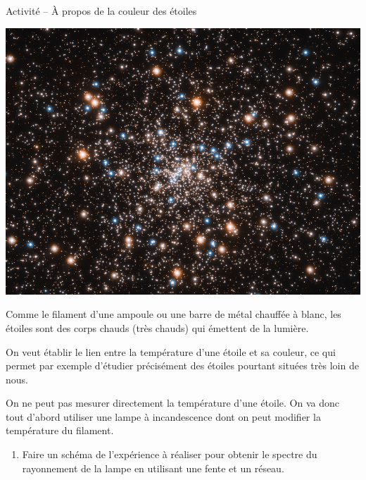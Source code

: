 \documentclass[12pt,a4paper,fleqn]{article}
\begin{document}
\begin{header}
Activité -- À propos de la couleur des étoiles
\end{header}

\begin{multicols}{2}
\begin{center}
\includegraphics[trim=0 100 0 100, clip, width=\linewidth]{images/hubble_globular_cluster.png}
\end{center}

Comme le filament d'une ampoule ou une barre de métal chauffée à blanc, les étoiles sont des corps chauds (très chauds) qui émettent de la lumière.

On veut établir le lien entre la température d'une étoile et sa couleur, ce qui permet par exemple d'étudier précisément des étoiles pourtant situées très loin de nous.
\end{multicols}

On ne peut pas mesurer directement la température d'une étoile.
On va donc tout d'abord utiliser une lampe à incandescence dont on peut modifier la température du filament. 

\begin{enumerate}
\item \rea{}

Faire un schéma de l'expérience à réaliser pour obtenir le spectre du rayonnement de la lampe en utilisant une fente et un réseau.

\vspace{100pt}
\end{enumerate}

\begin{appel}
\rea{}
\end{appel}
\end{document}
